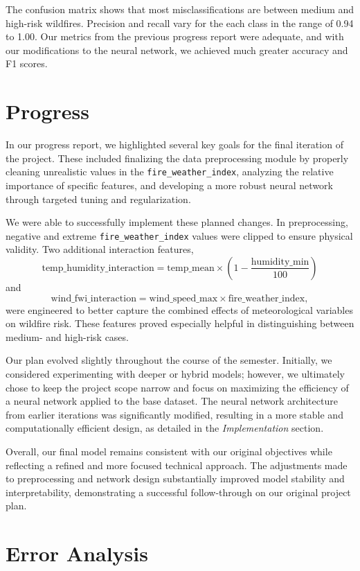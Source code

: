 \documentclass[11pt]{article}
\begin{document}
The confusion matrix shows that most misclassifications are between medium and high-risk wildfires. Precision and recall vary for the each class in the range of 0.94 to 1.00. 
Our metrics from the previous progress report were adequate, and with our modifications to the neural network, we achieved much greater accuracy and F1 scores.

\section{Progress}

In our progress report, we highlighted several key goals for the final iteration of the project. These included finalizing the data preprocessing module by properly cleaning unrealistic values in the \texttt{fire\_weather\_index}, analyzing the relative importance of specific features, and developing a more robust neural network through targeted tuning and regularization.

We were able to successfully implement these planned changes. In preprocessing, negative and extreme \texttt{fire\_weather\_index} values were clipped to ensure physical validity. Two additional interaction features,
\[
\text{temp\_humidity\_interaction} = \text{temp\_mean} \times (1 - \frac{\text{humidity\_min}}{100})
\]
and
\[
\text{wind\_fwi\_interaction} = \text{wind\_speed\_max} \times \text{fire\_weather\_index},
\]
were engineered to better capture the combined effects of meteorological variables on wildfire risk. These features proved especially helpful in distinguishing between medium- and high-risk cases.

Our plan evolved slightly throughout the course of the semester. Initially, we considered experimenting with deeper or hybrid models; however, we ultimately chose to keep the project scope narrow and focus on maximizing the efficiency of a neural network applied to the base dataset. The neural network architecture from earlier iterations was significantly modified, resulting in a more stable and computationally efficient design, as detailed in the \textit{Implementation} section.

Overall, our final model remains consistent with our original objectives while reflecting a refined and more focused technical approach. The adjustments made to preprocessing and network design substantially improved model stability and interpretability, demonstrating a successful follow-through on our original project plan.

\section{Error Analysis}
\end{document}

